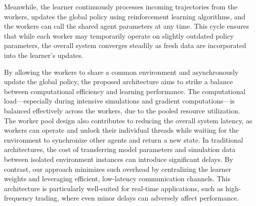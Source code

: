 \documentclass[11pt]{article}
\begin{document}
    Meanwhile, the learner continuously processes incoming trajectories from the workers, updates the global policy using reinforcement learning algorithms,
    and the workers can call the shared agent parameters at any time.
    This cycle ensures that while each worker may temporarily operate on slightly outdated policy parameters,
    the overall system converges steadily as fresh data are incorporated into the learner's updates.

    By allowing the workers to share a common environment and asynchronously update the global policy,
    the proposed architecture aims to strike a balance between computational efficiency and learning performance.
    The computational load—especially during intensive simulations and gradient computations—is balanced effectively
    across the workers, due to the pooled resource utilization.
    The worker pool design also contributes to reducing the overall system latency,
    as workers can operate and unlock their individual threads while waiting for the environment to synchronize other agents and return a new state.
    In traditional architectures, the cost of transferring model parameters and simulation data between isolated environment instances can introduce significant delays.
    By contrast, our approach minimizes such overhead by centralizing the learner weights and leveraging efficient, low-latency communication channels.
    This architecture is particularly well-suited for real-time applications, such as high-frequency trading,
    where even minor delays can adversely affect performance.

\end{document}
